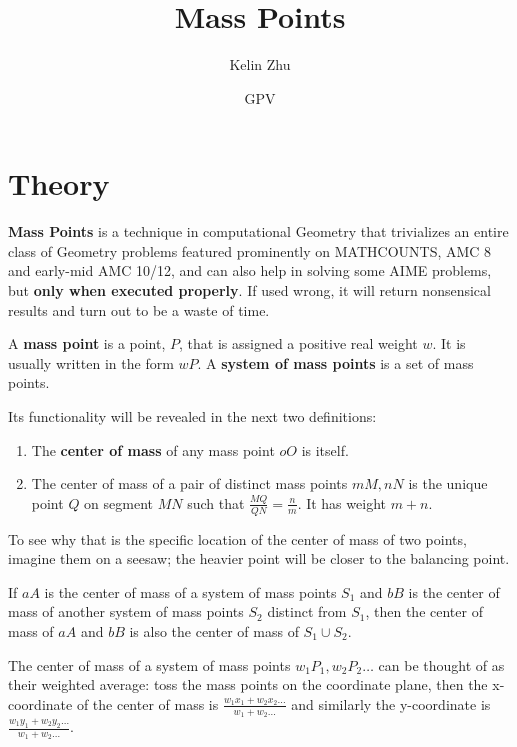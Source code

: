 \documentclass{article}
\title{Mass Points}
\author{Kelin Zhu}
\date{GPV}
\begin{document}
\maketitle
\section{Theory}
\textbf{Mass Points} is a technique in computational Geometry that trivializes an entire class of Geometry problems featured prominently on MATHCOUNTS, AMC 8 and early-mid AMC 10/12, and can also help in solving some AIME problems, but \textbf{only when executed properly}. If used wrong, it will return nonsensical results and turn out to be a waste of time.
\begin{defi}
A \textbf{mass point} is a point, $P$, that is assigned a positive real weight $w$. It is usually written in the form $wP$. A \textbf{system of mass points} is a set of mass points.
\end{defi}
Its functionality will be revealed in the next two definitions:
\begin{defi}

\begin{enumerate}
\item The \textbf{center of mass} of any mass point $oO$ is itself.
\item The center of mass of a pair of distinct mass points $mM,nN$ is the unique point $Q$ on segment $MN$ such that $\frac{MQ}{QN}=\frac{n}{m}$. It has weight $m+n$.
\end{enumerate}
\end{defi}
To see why that is the specific location of the center of mass of two points, imagine them on a seesaw; the heavier point will be closer to the balancing point.
\begin{defi}

If $aA$ is the center of mass of a system of mass points $S_1$ and $bB$ is the center of mass of another system of mass points $S_2$ distinct from $S_1$, then the center of mass of $aA$ and $bB$ is also the center of mass of $S_1\cup S_2$.

The center of mass of a system of mass points $w_1P_1,w_2P_2\ldots$ can be thought of as their weighted average: toss the mass points on the coordinate plane, then the x-coordinate of the center of mass is $\frac{w_1x_1+w_2x_2\ldots}{w_1+w_2\ldots}$ and similarly the y-coordinate is $\frac{w_1y_1+w_2y_2\ldots}{w_1+w_2\ldots}$.
\end{defi}
\end{document}
